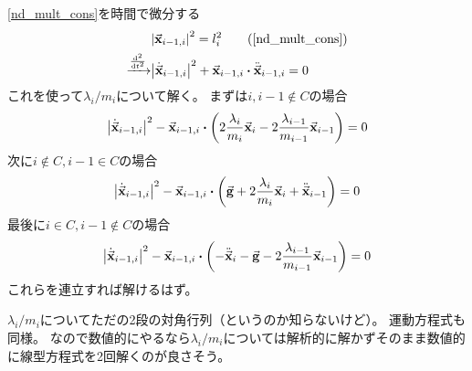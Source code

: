 \documentclass[uplatex]{jsarticle}
\begin{document}
\eqref{nd_mult_cons}を時間で微分する
\begin{align}
    & \abs{\va{x}_{i-1,i}}^2 = l_i^2 \tag{\ref{nd_mult_cons}} \\
    \xrightarrow{\dv[2]{}{t}} &
    \abs{\dot{\va{x}}_{i-1,i}}^2 + \va{x}_{i-1,i} \vdot \ddot{\va{x}}_{i-1,i} = 0
\end{align}
これを使って$\lambda_i/m_i$について解く。
まずは$i, i-1 \notin C$の場合
\begin{align}
    \abs{\dot{\va{x}}_{i-1,i}}^2 - \va{x}_{i-1,i} \vdot \qty(2\frac{\lambda_i}{m_i} \va{x}_i - 2\frac{\lambda_{i-1}}{m_{i-1}} \va{x}_{i-1}) = 0
\end{align}
次に$i \notin C, i-1 \in C$の場合
\begin{align}
    \abs{\dot{\va{x}}_{i-1,i}}^2 - \va{x}_{i-1,i} \vdot \qty(\va{g} + 2\frac{\lambda_i}{m_i} \va{x}_i + \ddot{\va{x}}_{i-1}) = 0
\end{align}
最後に$i \in C, i-1 \notin C$の場合
\begin{align}
    \abs{\dot{\va{x}}_{i-1,i}}^2 - \va{x}_{i-1,i} \vdot \qty(-\ddot{\va{x}}_i - \va{g} - 2\frac{\lambda_{i-1}}{m_{i-1}} \va{x}_{i-1}) = 0
\end{align}
これらを連立すれば解けるはず。

$\lambda_i/m_i$についてただの2段の対角行列（というのか知らないけど）。
運動方程式も同様。
なので数値的にやるなら$\lambda_i/m_i$については解析的に解かずそのまま数値的に線型方程式を2回解くのが良さそう。



\end{document}
